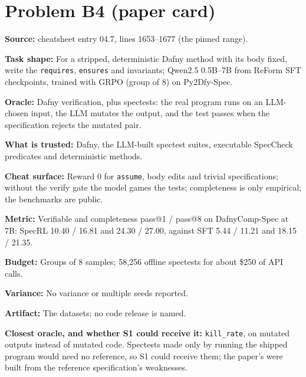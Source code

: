 \documentclass[11pt]{article}
\begin{document}
\section*{Problem B4 (paper card)}\label{ans:B4}
\begin{answer}
\textbf{Source:} cheatsheet entry 04.7, lines 1653--1677 (the pinned range).

\textbf{Task shape:} For a stripped, deterministic Dafny method with its body
fixed, write the \texttt{requires}, \texttt{ensures} and invariants; Qwen2.5
0.5B--7B from ReForm SFT checkpoints, trained with GRPO (group of 8) on
Py2Dfy-Spec.

\textbf{Oracle:} Dafny verification, plus spectests: the real program runs on
an LLM-chosen input, the LLM mutates the output, and the test passes when the
specification rejects the mutated pair.

\textbf{What is trusted:} Dafny, the LLM-built spectest suites, executable
SpecCheck predicates and deterministic methods.

\textbf{Cheat surface:} Reward 0 for \texttt{assume}, body edits and trivial
specifications; without the verify gate the model games the tests;
completeness is only empirical; the benchmarks are public.

\textbf{Metric:} Verifiable and completeness pass@1 / pass@8 on DafnyComp-Spec
at 7B: SpecRL 10.40 / 16.81 and 24.30 / 27.00, against SFT 5.44 / 11.21 and
18.15 / 21.35.

\textbf{Budget:} Groups of 8 samples; 58,256 offline spectests for about \$250
of API calls.

\textbf{Variance:} No variance or multiple seeds reported.

\textbf{Artifact:} The datasets; no code release is named.

\textbf{Closest oracle, and whether S1 could receive it:} \texttt{kill\_rate},
on mutated outputs instead of mutated code. Spectests made only by running the
shipped program would need no reference, so S1 could receive them; the paper's
were built from the reference specification's weaknesses.
\end{answer}

\end{document}

